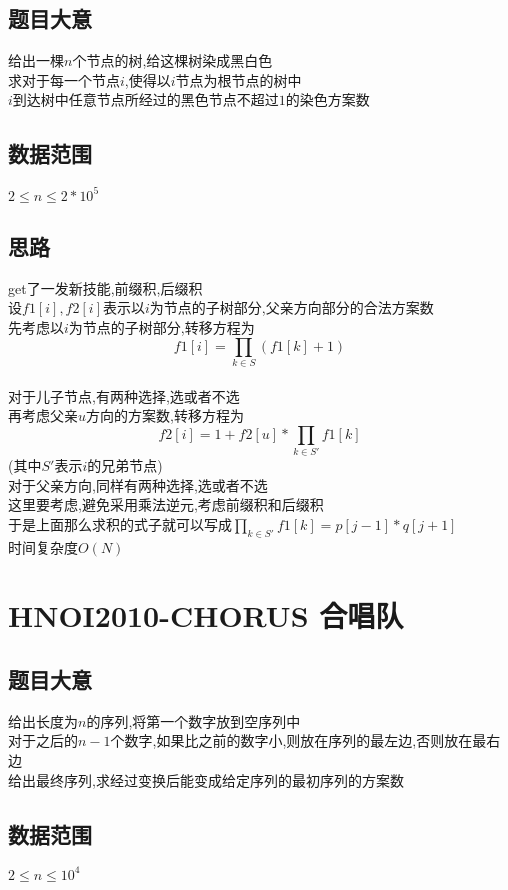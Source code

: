 \documentclass{ctexart}
\numberwithin{equation}{section}
\begin{document}
\begin{flushleft}
  \subsection{题目大意}
  给出一棵$n$个节点的树,给这棵树染成黑白色 \\
  求对于每一个节点$i$,使得以$i$节点为根节点的树中\\
  $i$到达树中任意节点所经过的黑色节点不超过$1$的染色方案数\\
  \subsection{数据范围}
  $2\le n \le 2*10^5$ \\
  \subsection{思路}
  get了一发新技能,前缀积,后缀积 \\
  设$f1[i],f2[i]$表示以$i$为节点的子树部分,父亲方向部分的合法方案数 \\
  先考虑以$i$为节点的子树部分,转移方程为$$f1[i]=\prod_{k \in S}(f1[k]+1)$$ \\
  对于儿子节点,有两种选择,选或者不选 \\
  再考虑父亲$u$方向的方案数,转移方程为$$f2[i]=1+f2[u]*\prod_{k \in S'}f1[k]$$(其中$S'$表示$i$的兄弟节点) \\
  对于父亲方向,同样有两种选择,选或者不选 \\
  这里要考虑,避免采用乘法逆元,考虑前缀积和后缀积 \\
  于是上面那么求积的式子就可以写成$\prod_{k \in S'}f1[k]=p[j-1]*q[j+1]$ \\
  时间复杂度$O(N)$ \\
  \newpage

  \section{HNOI2010-CHORUS 合唱队}
  \subsection{题目大意}
  给出长度为$n$的序列,将第一个数字放到空序列中 \\
  对于之后的$n-1$个数字,如果比之前的数字小,则放在序列的最左边,否则放在最右边 \\
  给出最终序列,求经过变换后能变成给定序列的最初序列的方案数 \\
  \subsection{数据范围}
  $2\le n \le 10^4$ \\

\end{flushleft}
\end{document}
